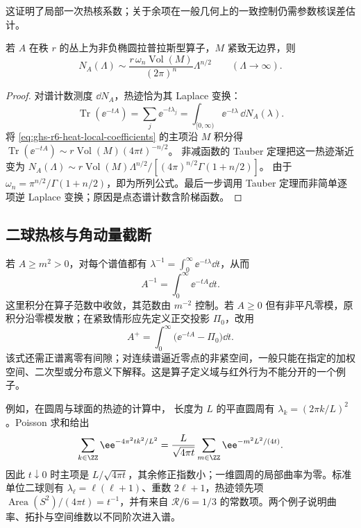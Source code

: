 这证明了局部一次热核系数；关于余项在一般几何上的一致控制仍需参数核误差估计。

\begin{proposition}\label{prop:ghs-r6-tauberian-weyl}
若 $A$ 在秩 $r$ 的丛上为非负椭圆拉普拉斯型算子，$M$ 紧致无边界，则
\begin{equation}\label{eq:ghs-r6-leading-weyl}
N_A(\Lambda)\sim\frac{r\,\omega_n\operatorname{Vol}(M)}{(2\pi)^n}\Lambda^{n/2}
\qquad(\Lambda\to\infty).
\end{equation}
\end{proposition}
\begin{proof}
对谱计数测度 $\dd N_A$，热迹恰为其 Laplace 变换：
\[
\operatorname{Tr}(\ee^{-tA})=\sum_j\ee^{-t\lambda_j}
=\int_{[0,\infty)}\ee^{-t\lambda}\,\dd N_A(\lambda).
\]
将 \cref{eq:ghs-r6-heat-local-coefficients} 的主项沿 $M$ 积分得
$\operatorname{Tr}(\ee^{-tA})\sim r\operatorname{Vol}(M)(4\pi t)^{-n/2}$。
非减函数的 Tauber 定理把这一热迹渐近变为
$N_A(\Lambda)\sim r\operatorname{Vol}(M)\Lambda^{n/2}/[(4\pi)^{n/2}\Gamma(1+n/2)]$。
由于 $\omega_n=\pi^{n/2}/\Gamma(1+n/2)$，即为所列公式。最后一步调用 Tauber 定理而非简单逐项逆 Laplace 变换；原因是点态谱计数含阶梯函数。
\end{proof}

\subsection{二球热核与角动量截断}
\label{sec:ghs-heat-kernel-boundary}

若 $A\ge m^2>0$，对每个谱值都有 $\lambda^{-1}=\int_0^\infty\ee^{-t\lambda}\dd t$，从而
\begin{equation}\label{eq:ghs-r6-green-propertime}
A^{-1}=\int_0^\infty\ee^{-tA}\dd t.
\end{equation}
这里积分在算子范数中收敛，其范数由 $m^{-2}$ 控制。若 $A\ge0$ 但有非平凡零模，原积分沿零模发散；在紧致情形应先定义正交投影 $\Pi_0$，改用
\[
A^+=\int_0^\infty\bigl(\ee^{-tA}-\Pi_0\bigr)\dd t.
\]
该式还需正谱离零有间隙；对连续谱逼近零点的非紧空间，一般只能在指定的加权空间、二次型或分布意义下解释。这是算子定义域与红外行为不能分开的一个例子。

例如，在圆周与球面的热迹的计算中，
\label{ex:ghs-r6-circle-heat}
长度为 $L$ 的平直圆周有 $\lambda_k=(2\pi k/L)^2$。Poisson 求和给出
\[
\sum_{k\in\ZZ}\ee^{-4\pi^2tk^2/L^2}
=\frac{L}{\sqrt{4\pi t}}\sum_{m\in\ZZ}\ee^{-m^2L^2/(4t)}.
\]
因此 $t\downarrow0$ 时主项是 $L/\sqrt{4\pi t}$，其余修正指数小；一维圆周的局部曲率为零。标准单位二球则有 $\lambda_\ell=\ell(\ell+1)$、重数 $2\ell+1$，热迹领先项 $\operatorname{Area}(S^2)/(4\pi t)=t^{-1}$，并有来自 $\mathcal R/6=1/3$ 的常数项。两个例子说明曲率、拓扑与空间维数以不同阶次进入谱。

